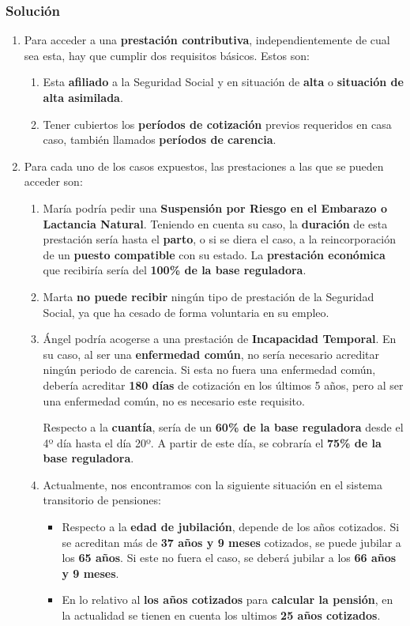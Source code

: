 \subsubsection{Solución}
\begin{enumerate}[label=\alph*)]
    \item Para acceder a una \textbf{prestación contributiva}, independientemente de cual sea esta, hay que cumplir dos requisitos básicos. Estos son:
    \begin{enumerate}
        \item Esta \textbf{afiliado} a la Seguridad Social y en situación de \textbf{alta} o \textbf{situación de alta asimilada}.
        \item Tener cubiertos los \textbf{períodos de cotización} previos requeridos en casa caso, también llamados \textbf{períodos de carencia}.
    \end{enumerate}

    \item Para cada uno de los casos expuestos, las prestaciones a las que se pueden acceder son:
    \begin{enumerate}
        \item María podría pedir una \textbf{Suspensión por Riesgo en el Embarazo o Lactancia Natural}. Teniendo en cuenta su caso, la \textbf{duración} de esta prestación sería hasta el \textbf{parto}, o si se diera el caso, a la reincorporación de un \textbf{puesto compatible} con su estado. La \textbf{prestación económica} que recibiría sería del \textbf{100\% de la base reguladora}.

        \item  Marta \textbf{no puede recibir} ningún tipo de prestación de la Seguridad Social, ya que ha cesado de forma voluntaria en su empleo.

        \item Ángel podría acogerse a una prestación de \textbf{Incapacidad Temporal}. En su caso, al ser una \textbf{enfermedad común}, no sería necesario acreditar ningún periodo de carencia. Si esta no fuera una enfermedad común, debería acreditar \textbf{180 días} de cotización en los últimos 5 años, pero al ser una enfermedad común, no es necesario este requisito.

        Respecto a la \textbf{cuantía}, sería de un \textbf{60\% de la base reguladora} desde el 4º día hasta el día 20º. A partir de este día, se cobraría el \textbf{75\% de la base reguladora}.

        \item Actualmente, nos encontramos con la siguiente situación en el sistema transitorio de pensiones:
        \begin{itemize}
            \item Respecto a la \textbf{edad de jubilación}, depende de los años cotizados. Si se acreditan más de \textbf{37 años y 9 meses} cotizados, se puede jubilar a los \textbf{65 años}. Si este no fuera el caso, se deberá jubilar a los \textbf{66 años y 9 meses}.
            \item En lo relativo al \textbf{los años cotizados} para \textbf{calcular la pensión}, en la actualidad se tienen en cuenta los ultimos \textbf{25 años cotizados}.


\end{itemize}
\end{enumerate}
\end{enumerate}
